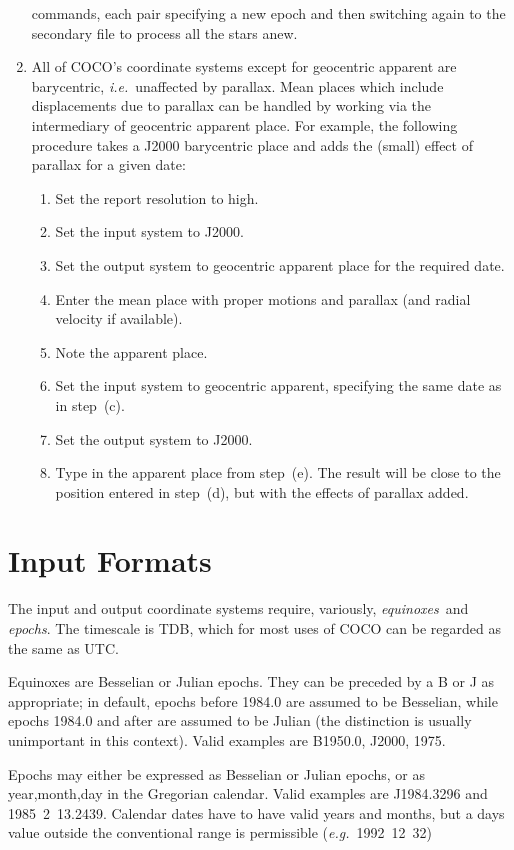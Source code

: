 \begin{enumerate}
commands, each pair specifying a new epoch and then switching again
to the secondary file to process all the stars anew.
\item All of COCO's coordinate systems except for geocentric apparent
are barycentric, {\it i.e.}\ unaffected by parallax.
Mean places which include displacements
due to parallax can be handled by working
via the intermediary of geocentric
apparent place.  For example, the following procedure takes a J2000
barycentric place and adds the (small) effect of parallax for a
given date:
\begin{enumerate}
\item Set the report resolution to high.
\item Set the input system to J2000.
\item Set the output system to geocentric apparent place for
      the required date.
\item Enter the mean place with proper motions and parallax (and radial
      velocity if available).
\item Note the apparent place.
\item Set the input system to geocentric apparent, specifying the
      same date as in step~(c).
\item Set the output system to J2000.
\item Type in the apparent place from step~(e).  The result will be close
      to the position entered in step~(d), but with the effects of parallax
      added.
\end{enumerate}
\end{enumerate}

\section{Input Formats}

The input and output coordinate systems require, variously,
{\it equinoxes}\, and {\it epochs}. The timescale is TDB, which
for most uses of COCO can be regarded as the same as UTC.

Equinoxes are Besselian or Julian epochs.
They can be preceded by a B or J as appropriate; in default,
epochs before 1984.0 are assumed to be Besselian, while epochs
1984.0 and after are assumed to be Julian (the distinction is
usually unimportant in this context). 
Valid examples are B1950.0, J2000, 1975.

Epochs may either be expressed as Besselian or Julian epochs,
or as year,month,day in the Gregorian calendar.
Valid examples are J1984.3296 and 1985~2~13.2439.
Calendar dates have to have valid years and months, but a days
value outside the
conventional range is permissible ({\it e.g.}~1992~12~32)

